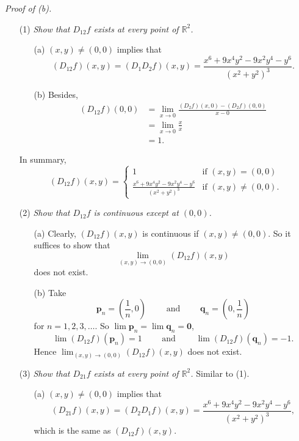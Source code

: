 \documentclass{article}
\begin{document}
\emph{Proof of (b).}
\begin{enumerate}
\item[(1)]
  \emph{Show that $D_{12}f$ exists at every point of $\mathbb{R}^2$.}
  \begin{enumerate}
  \item[(a)]
    $(x,y) \neq (0,0)$ implies that
    \[
      (D_{12} f)(x,y)
      = (D_{1}D_{2} f)(x,y)
      = \frac{x^6+9x^4y^2-9x^2y^4-y^6}{(x^2+y^2)^3}.
    \]

  \item[(b)]
    Besides,
    \begin{align*}
      (D_{12} f)(0,0)
      &= \lim_{x \to 0} \frac{(D_2 f)(x,0) - (D_2 f)(0,0)}{x - 0} \\
      &= \lim_{x \to 0} \frac{x}{x} \\
      &= 1.
    \end{align*}
  \end{enumerate}
  In summary,
  \begin{equation*}
    (D_{12} f)(x,y) =
    \begin{cases}
      1
        & \text{if $(x,y) = (0,0)$} \\
      \frac{x^6+9x^4y^2-9x^2y^4-y^6}{(x^2+y^2)^3}
        & \text{if $(x,y) \neq (0,0)$}.
    \end{cases}
  \end{equation*}

\item[(2)]
  \emph{Show that $D_{12}f$ is continuous except at $(0,0)$.}
  \begin{enumerate}
  \item[(a)]
    Clearly, $(D_{12} f)(x,y)$ is continuous if $(x,y) \neq (0,0)$.
    So it suffices to show that
    \[
      \lim_{(x,y) \to (0,0)} (D_{12} f)(x,y)
    \]
    does not exist.

  \item[(b)]
    Take
    \[
      \mathbf{p}_n = \left( \frac{1}{n}, 0 \right)
      \qquad
      \text{ and }
      \qquad
      \mathbf{q}_n = \left( 0, \frac{1}{n} \right)
    \]
    for $n = 1,2,3,\ldots$.
    So $\lim \mathbf{p}_n = \lim \mathbf{q}_n = \mathbf{0}$,
    \[
      \lim (D_{12} f)(\mathbf{p}_n) = 1
      \qquad
      \text{ and }
      \qquad
      \lim (D_{12} f)(\mathbf{q}_n) = -1.
    \]
    Hence $\lim_{(x,y) \to (0,0)} (D_{12} f)(x,y)$ does not exist.
  \end{enumerate}

\item[(3)]
  \emph{Show that $D_{21}f$ exists at every point of $\mathbb{R}^2$.}
  Similar to (1).
  \begin{enumerate}
  \item[(a)]
    $(x,y) \neq (0,0)$ implies that
    \[
      (D_{21} f)(x,y)
      = (D_{2}D_{1} f)(x,y)
      = \frac{x^6+9x^4y^2-9x^2y^4-y^6}{(x^2+y^2)^3},
    \]
    which is the same as $(D_{12} f)(x,y)$.


\end{enumerate}
\end{enumerate}
\end{document}
